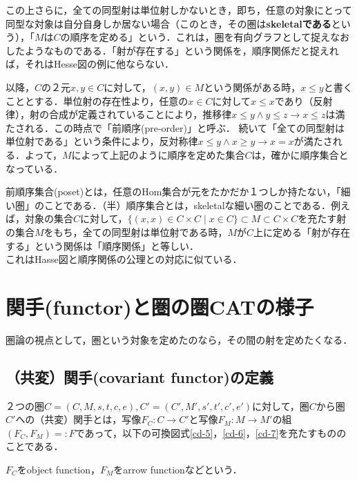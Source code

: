 \documentclass[uplatex, 12pt, dvipdfmx]{jsreport}
\begin{document}
この上さらに，全ての同型射は単位射しかないとき，即ち，任意の対象にとって同型な対象は自分自身しか居ない場合（このとき，その圏は\textbf{skeletalである}という），「$M$は$C$の順序を定める」という．これは，圏を有向グラフとして捉えなおしたようなものである．「射が存在する」という関係を，順序関係だと捉えれば，それはHesse図の例に他ならない．

以降，$C$の２元$x,y\in C$に対して，$(x,y)\in M$という関係がある時，$x\le y$と書くこととする．単位射の存在性より，任意の$x\in C$に対して$x\le x$であり（反射律），射の合成が定義されていることにより，推移律$x\le y \wedge y\le z \rightarrow x\le z$は満たされる．この時点で「前順序(pre-order)」と呼ぶ．
続いて「全ての同型射は単位射である」という条件により，反対称律$x\le y \wedge x\ge y \rightarrow x=x$が満たされる．よって，$M$によって上記のように順序を定めた集合$C$は，確かに順序集合となっている．

\begin{screen}
    前順序集合(poset)とは，任意のHom集合が元をたかだか１つしか持たない，「細い圏」のことである．（半）順序集合とは，skeletalな細い圏のことである．例えば，対象の集合$C$に対して，$\{ (x,x) \in C\times C \mid x\in C \}\subset M\subset C\times C$を充たす射の集合$M$をもち，全ての同型射は単位射である時，$M$が$C$上に定める「射が存在する」という関係は「順序関係」と等しい．\\
    これはHasse図と順序関係の公理との対応に似ている．
\end{screen}

\clearpage
\chapter{関手(functor)と圏の圏\textbf{CAT}の様子}

圏論の視点として，圏という対象を定めたのなら，その間の射を定めたくなる．

\section{（共変）関手(covariant functor)の定義}

\begin{shadebox}\begin{definition}[（共変）関手]
    ２つの圏$C=(C,M,s,t,c,e),C'=(C',M',s',t',c',e')$に対して，圏$C$から圏$C'$への（共変）関手とは，写像$F_C:C\rightarrow C'$と写像$F_M:M\rightarrow M'$の組$(F_C,F_M)=:F$であって，以下の可換図式\ref{cd-5}，\ref{cd-6}，\ref{cd-7}を充たすもののことである．
\end{definition}\end{shadebox}
$F_C$をobject function，$F_M$をarrow functionなどという．
\end{document}
